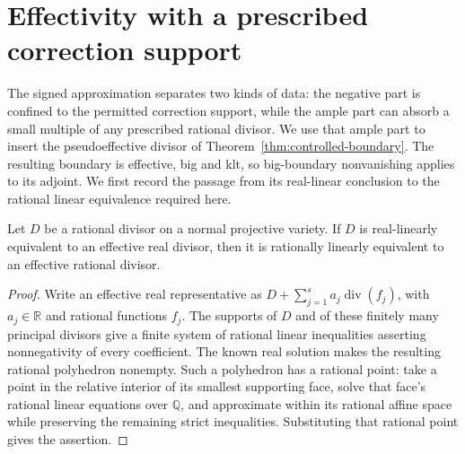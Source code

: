 \section{Effectivity with a prescribed correction support}
\label{sec:effectivity}

The signed approximation separates two kinds of data: the negative
part is confined to the permitted correction support, while the ample
part can absorb a small multiple of any prescribed rational divisor.
We use that ample part to insert the pseudoeffective divisor of
Theorem~\ref{thm:controlled-boundary}.  The resulting boundary is
effective, big and klt, so big-boundary nonvanishing applies to its
adjoint.  We first record the passage from its real-linear conclusion
to the rational linear equivalence required here.

\begin{lemma}\label{lem:rational-recovery}
Let $D$ be a rational divisor on a normal projective variety.
If $D$ is real-linearly equivalent to an effective real divisor, then
it is rationally linearly equivalent to an effective rational divisor.
\end{lemma}
\begin{proof}
Write an effective real representative as
$D+\sum_{j=1}^s a_j\operatorname{div}(f_j)$, with $a_j\in\mathbb R$
and rational functions $f_j$.  The supports of $D$ and of these finitely
many principal divisors give a finite system of rational linear
inequalities asserting nonnegativity of every coefficient.
The known real solution makes the resulting rational polyhedron
nonempty.  Such a polyhedron has a rational point: take a point in the
relative interior of its smallest supporting face, solve that face's
rational linear equations over $\mathbb Q$, and approximate within
its rational affine space while preserving the remaining strict
inequalities.  Substituting that rational point gives the assertion.
\end{proof}

